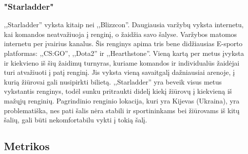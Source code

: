 \documentclass{VUMIFPSkursinis}
\begin{document}
    \subsubsection*{"Starladder"} \label{isorineVersloProcesoAnalize_esamuSistemuAnalize_starladder}
       \label{isorineVersloProcesoAnalize_esamuSistemuAnalize_starladder_veikimas}
       ,,Starladder'' vyksta kitaip nei ,,Blizzcon''. Daugiausia varžybų vyksta internetu, kai komandos neatvažiuoja  į renginį, o žaidžia savo šalyse.
        Varžybos matomos internetu per įvairius kanalus. Šis renginys apima tris bene didžiausias E-sporto platformas: ,,CS:GO'', ,,Dota2'' ir ,,Hearthstone''.
        Vieną kartą per metus įvyksta ir kiekvieno iš šių žaidimų turnyras, kuriame komandos ir individualūs žaidėjai turi atvažiuoti į patį renginį. Jis
        vyksta vieną savaitgalį dažniausiai arenoje, į kurią žiūrovai gali nusipirkti bilietą.
       \label{isorineVersloProcesoAnalize_esamuSistemuAnalize_starladder_trukumai}
        ,,Starladder'' yra beveik visus metus vykstantis renginys, todėl sunku pritraukti didelį kiekį žiūrovų į kiekvieną iš mažųjų renginių. Pagrindinio
        renginio lokacija, kuri yra Kijevas (Ukraina), yra problematiška, nes pati šalis nėra stabili ir sportininkams bei žiūrovams iš kitų šalių, gali būti
        nekomfortabilu vykti į tokią šalį.
  \subsection{Metrikos} \label{isorineVersloProcesoAnalize_metrikos}
    
\end{document}
